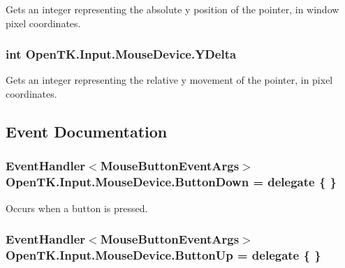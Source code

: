 Gets an integer representing the absolute y position of the pointer, in window pixel coordinates. 

\hypertarget{class_open_t_k_1_1_input_1_1_mouse_device_ab1689cd29ee92df3c5ca955b166636e4}{
\subsubsection[{Y\-Delta}]{\setlength{\rightskip}{0pt plus 5cm}int Open\-T\-K.\-Input.\-Mouse\-Device.\-Y\-Delta\hspace{0.3cm}{\ttfamily [get]}}}\label{class_open_t_k_1_1_input_1_1_mouse_device_ab1689cd29ee92df3c5ca955b166636e4}


Gets an integer representing the relative y movement of the pointer, in pixel coordinates. 



\subsection{Event Documentation}
\hypertarget{class_open_t_k_1_1_input_1_1_mouse_device_a6d161629ddeb7adefb6f8332824778bd}{
\subsubsection[{Button\-Down}]{\setlength{\rightskip}{0pt plus 5cm}Event\-Handler$<${\bf Mouse\-Button\-Event\-Args}$>$ Open\-T\-K.\-Input.\-Mouse\-Device.\-Button\-Down = delegate \{ \}}}\label{class_open_t_k_1_1_input_1_1_mouse_device_a6d161629ddeb7adefb6f8332824778bd}


Occurs when a button is pressed. 

\hypertarget{class_open_t_k_1_1_input_1_1_mouse_device_a244f6f68b32bfe3f745e2b8087e970e8}{
\subsubsection[{Button\-Up}]{\setlength{\rightskip}{0pt plus 5cm}Event\-Handler$<${\bf Mouse\-Button\-Event\-Args}$>$ Open\-T\-K.\-Input.\-Mouse\-Device.\-Button\-Up = delegate \{ \}}}\label{class_open_t_k_1_1_input_1_1_mouse_device_a244f6f68b32bfe3f745e2b8087e970e8}


